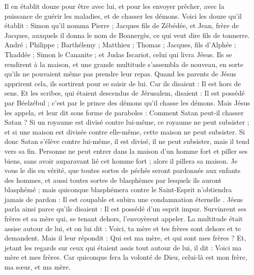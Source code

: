 \begin{multicols}{2}
Il en établit douze pour être avec lui,
et pour les envoyer prêcher, avec la puissance de guérir les maladies, et de chasser les démons.
Voici les douze qu’il établit : Simon qu'il nomma Pierre ;
Jacques fils de Zébédée, et Jean, frère de Jacques, auxquels il donna le nom de Boanergès, ce qui veut dire fils de tonnerre.
André ; Philippe ; Barthélemy ; Matthieu ; Thomas ; Jacques, fils d'Alphée ; Thaddée ; Simon le Cananite ;
et Judas Iscariot, celui qui livra Jésus.
Ils se rendirent à la maison, et une grande multitude s’assembla de nouveau, en sorte qu’ils ne pouvaient même pas prendre leur repas.
Quand les parents de Jésus apprirent cela, ils sortirent pour se saisir de lui. Car ils disaient : Il est hors de sens.
Et les scribes, qui étaient descendus de Jérusalem, disaient : Il est possédé par Béelzébul ; c’est par le prince des démons qu’il chasse les démons.
Mais Jésus les appela, et leur dit sous forme de paraboles : Comment Satan peut-il chasser Satan ?
Si un royaume est divisé contre lui-même, ce royaume ne peut subsister ;
et si une maison est divisée contre elle-même, cette maison ne peut subsister.
Si donc Satan s'élève contre lui-même, il est divisé, il ne peut subsister, mais il tend vers sa fin.
Personne ne peut entrer dans la maison d'un homme fort et piller ses biens, sans avoir auparavant lié cet homme fort ; alors il pillera sa maison.
Je vous le dis en vérité, que toutes sortes de péchés seront pardonnés aux enfants des hommes, et aussi toutes sortes de blasphèmes par lesquels ils auront blasphémé ;
mais quiconque blasphémera contre le Saint-Esprit n’obtiendra jamais de pardon : Il est coupable et subira une condamnation éternelle {}.
Jésus parla ainsi parce qu'ils disaient : Il est possédé d'un esprit impur.
Survinrent ses frères et sa mère qui, se tenant dehors, l'envoyèrent appeler. La multitude était assise autour de lui,
et on lui dit : Voici, ta mère et tes frères sont dehors et te demandent.
Mais il leur répondit : Qui est ma mère, et qui sont mes frères ?
Et, jetant les regards sur ceux qui étaient assis tout autour de lui, il dit : Voici ma mère et mes frères.
Car quiconque fera la volonté de Dieu, celui-là est mon frère, ma sœur, et ma mère.

\end{multicols}
